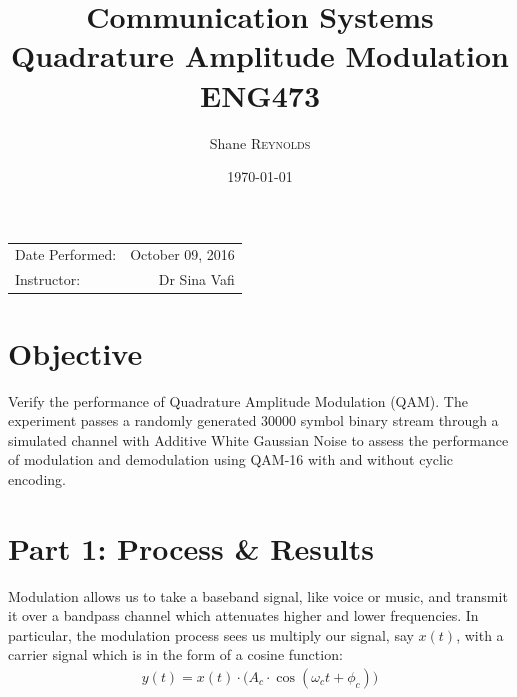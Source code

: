 \documentclass{article}
\title{Communication Systems \\ Quadrature Amplitude Modulation \\ ENG473} %
\author{Shane \textsc{Reynolds}} %
\date{\today} %
\begin{document}
\maketitle %

\begin{center}
\begin{tabular}{l r}
Date Performed: & October 09, 2016 \\ %
Instructor: & Dr Sina Vafi %
\end{tabular}
\end{center}



\section{Objective}

Verify the performance of Quadrature Amplitude Modulation (QAM). The experiment passes a randomly generated 30000 symbol binary stream through a simulated channel with Additive White Gaussian Noise to assess the performance of modulation and demodulation using QAM-16 with and without cyclic encoding.


\section{Part 1: Process \& Results}
 Modulation allows us to take a baseband signal, like voice or music, and transmit it over a bandpass channel which attenuates higher and lower frequencies. In particular, the modulation process sees us multiply our signal, say $x(t)$, with a carrier signal which is in the form of a cosine function:
\begin{align}
	y(t) = x(t) \cdot \big(A_c \cdot \cos(\omega_c t + \phi_c)\big)
\end{align}
\end{document}
